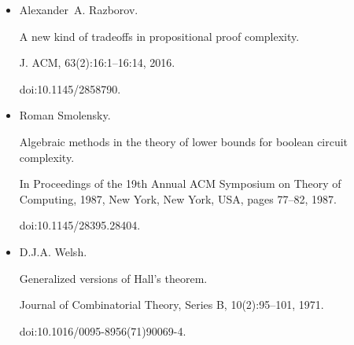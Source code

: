 \documentclass[10pt,a4paper]{article}
\begin{document}
\begin{itemize}
Mat. Zametki, 41:598–607, 1987.





\item 
[22]

Alexander A. Razborov.


A new kind of tradeoffs in propositional proof complexity.


J. ACM, 63(2):16:1–16:14, 2016.


doi:10.1145/2858790.





\item 
[23]

Roman Smolensky.


Algebraic methods in the theory of lower bounds for boolean circuit
complexity.


In Proceedings of the 19th Annual ACM Symposium on Theory of
Computing, 1987, New York, New York, USA, pages 77–82, 1987.


doi:10.1145/28395.28404.





\item 
[24]

D.J.A. Welsh.


Generalized versions of Hall’s theorem.


Journal of Combinatorial Theory, Series B, 10(2):95–101, 1971.


doi:10.1016/0095-8956(71)90069-4.





\end{itemize}
\end{document}

